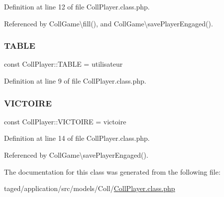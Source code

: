 Definition at line 12 of file Coll\+Player.\+class.\+php.



Referenced by Coll\+Game\textbackslash{}fill(), and Coll\+Game\textbackslash{}save\+Player\+Engaged().

\mbox{\label{class_coll_player_aedaacd415cfe00a481997c365e2e5439}} 
\subsubsection{\texorpdfstring{T\+A\+B\+LE}{TABLE}}
{\footnotesize\ttfamily const Coll\+Player\+::\+T\+A\+B\+LE = \textquotesingle{}utilisateur\textquotesingle{}}



Definition at line 9 of file Coll\+Player.\+class.\+php.

\mbox{\label{class_coll_player_a9e7f37b5adcc9973111bad614c8f3b5f}} 
\subsubsection{\texorpdfstring{V\+I\+C\+T\+O\+I\+RE}{VICTOIRE}}
{\footnotesize\ttfamily const Coll\+Player\+::\+V\+I\+C\+T\+O\+I\+RE = \textquotesingle{}victoire\textquotesingle{}}



Definition at line 14 of file Coll\+Player.\+class.\+php.



Referenced by Coll\+Game\textbackslash{}save\+Player\+Engaged().



The documentation for this class was generated from the following file\+:\begin{DoxyCompactItemize}
\item 
taged/application/src/models/\+Coll/\hyperlink{_coll_player_8class_8php}{Coll\+Player.\+class.\+php}\end{DoxyCompactItemize}
